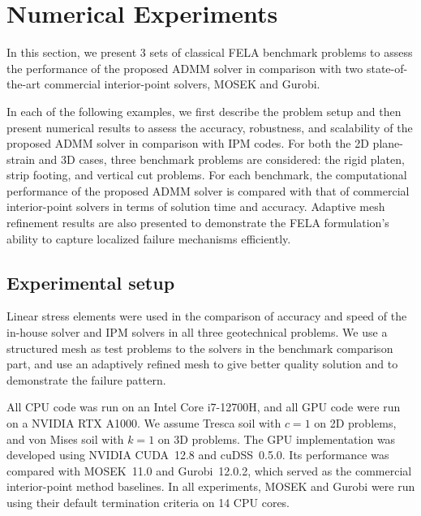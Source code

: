 \section{Numerical Experiments}

In this section, we present 3 sets of classical FELA benchmark problems to assess the performance of the proposed ADMM solver in comparison with two state-of-the-art commercial interior-point solvers, MOSEK and Gurobi.

In each of the following examples, we first describe the problem setup and then present numerical results to assess the accuracy, robustness, and scalability of the proposed ADMM solver in comparison with IPM codes. For both the 2D plane-strain and 3D cases, three benchmark problems are considered: the rigid platen, strip footing, and vertical cut problems. For each benchmark, the computational performance of the proposed ADMM solver is compared with that of commercial interior-point solvers in terms of solution time and accuracy. Adaptive mesh refinement results are also presented to demonstrate the FELA formulation’s ability to capture localized failure mechanisms efficiently. 

\subsection{Experimental setup}

Linear stress elements were used in the comparison of accuracy and speed of the in-house solver and IPM solvers in all three geotechnical problems. We use a structured mesh as test problems to the solvers in the benchmark comparison part, and use an adaptively refined mesh to give better quality solution and to demonstrate the failure pattern.

All CPU code was run on an Intel Core i7-12700H, and all GPU code were run on a NVIDIA RTX A1000. We assume Tresca soil with $c = 1$ on 2D problems, and von Mises soil with $k = 1$ on 3D problems. The GPU implementation was developed using NVIDIA CUDA~12.8 and cuDSS~0.5.0. Its performance was compared with MOSEK~11.0 and Gurobi~12.0.2, which served as the commercial interior-point method baselines. In all experiments, MOSEK and Gurobi were run using their default termination criteria on 14 CPU cores.

